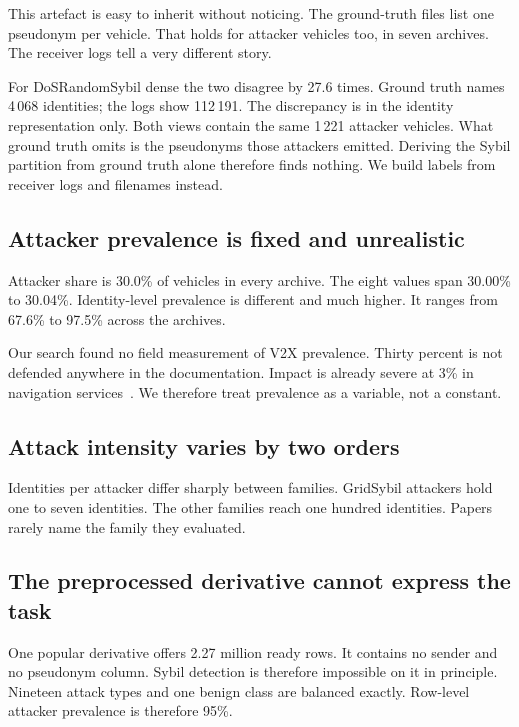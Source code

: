 \documentclass[conference]{IEEEtran}
\begin{document}
This artefact is easy to inherit without noticing.
The ground-truth files list one pseudonym per vehicle.
That holds for attacker vehicles too, in seven archives.
The receiver logs tell a very different story.

For DoSRandomSybil dense the two disagree by 27.6 times.
Ground truth names 4\,068 identities; the logs show 112\,191.
The discrepancy is in the identity representation only.
Both views contain the same 1\,221 attacker vehicles.
What ground truth omits is the pseudonyms those attackers emitted.
Deriving the Sybil partition from ground truth alone therefore finds nothing.
We build labels from receiver logs and filenames instead.

\subsection{Attacker prevalence is fixed and unrealistic}

Attacker share is 30.0\% of vehicles in every archive.
The eight values span 30.00\% to 30.04\%.
Identity-level prevalence is different and much higher.
It ranges from 67.6\% to 97.5\% across the archives.

Our search found no field measurement of V2X prevalence.
Thirty percent is not defended anywhere in the documentation.
Impact is already severe at 3\% in navigation services~\cite{soderhall2025}.
We therefore treat prevalence as a variable, not a constant.

\subsection{Attack intensity varies by two orders}

Identities per attacker differ sharply between families.
GridSybil attackers hold one to seven identities.
The other families reach one hundred identities.
Papers rarely name the family they evaluated.

\subsection{The preprocessed derivative cannot express the task}

One popular derivative offers 2.27 million ready rows.
It contains no sender and no pseudonym column.
Sybil detection is therefore impossible on it in principle.
Nineteen attack types and one benign class are balanced exactly.
Row-level attacker prevalence is therefore 95\%.
\end{document}
